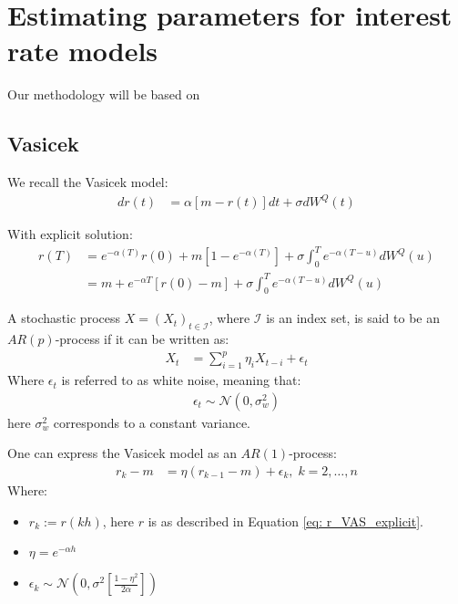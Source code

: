 \chapter{Estimating parameters for interest rate models} 

Our methodology will be based on \cite{remillard2013statistical}

\section{Vasicek}
We recall the Vasicek model: 
\begin{align*}
dr(t) &= \alpha[m - r(t)]dt + \sigma dW^{Q}(t)    
\end{align*}

With explicit solution:
\begin{align}
\label{eq: r_VAS_explicit}
r(T) &= e^{-\alpha(T)}r(0) + m[1-e^{-\alpha(T)}] 
+ \sigma \int_{0}^{T}e^{-\alpha(T-u)}dW^{Q}(u) \nonumber \\ 
&= 
m + e^{-\alpha T}\left[r(0) -m \right]
+ \sigma \int_{0}^{T}e^{-\alpha(T-u)}dW^{Q}(u)
\end{align} 

\begin{definition}
A stochastic process $X = (X_{t})_{t \in \mathcal{I}}$, where $\mathcal{I}$ is an index set, is said to be an $AR(p)$-process if it can be written as:
\begin{align*}
X_{t} &= \sum_{i=1}^{p}\eta_{i}X_{t-i} + \epsilon_{t} 
\end{align*}
Where $\epsilon_{t}$ is referred to as white noise, meaning that: 
\begin{align*}
\epsilon_{t} \sim \mathcal{N}\left(
0, \sigma_{w}^{2}
\right)    
\end{align*}
here $\sigma_{w}^{2}$ corresponds to a constant variance. 
\end{definition} 

\begin{proposition}
One can express the Vasicek model as an $AR(1)$-process: 
\begin{align*}
r_{k}-m &= \eta (r_{k-1}-m) + \epsilon_{k}, \; k = 2, \dots, n     
\end{align*}
Where:
\begin{itemize}[leftmargin =*]
    \item $r_{k} := r(kh)$, here $r$ is as described in Equation \ref{eq: r_VAS_explicit}.
    \item $\eta = e^{-\alpha h}$
    \item $\epsilon_{k} \sim \mathcal{N}\left(
    0, \sigma^{2}\left[
    \frac{1-\eta^{2}}{2\alpha}
    \right]\right)$
\end{itemize}
\end{proposition}

